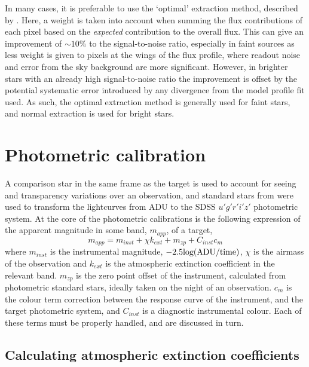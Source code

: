 In many cases, it is preferable to use the `optimal' extraction method, described by \citet{naylor1998}. Here, a weight is taken into account when summing the flux contributions of each pixel based on the {\it expected} contribution to the overall flux.
This can give an improvement of $\sim 10\%$ to the signal-to-noise ratio, especially in faint sources as less weight is given to pixels at the wings of the flux profile, where readout noise and error from the sky background are more significant.
However, in brighter stars with an already high signal-to-noise ratio the improvement is offset by the potential systematic error introduced by any divergence from the model profile fit used. As such, the optimal extraction method is generally used for faint stars, and normal extraction is used for bright stars.



\section{Photometric calibration}
\label{sect:observations:photometric extraction and calibration}

A comparison star in the same frame as the target is used to account for seeing and transparency variations over an observation, and standard stars from \citet{smith2002} were used to transform the lightcurves from ADU to the SDSS $u'g'r'i'z'$ photometric system. At the core of the photometric calibrations is the following expression of the apparent magnitude in some band, $m_{app}$, of a target,
\begin{equation}
    \label{eqn:observations:instrumental magnitude from scratch}
    m_{app} = m_{inst} + \chi k_{ext} + m_{zp} + C_{inst}c_{m}
\end{equation}
where $m_{inst}$ is the instrumental magnitude, $-2.5 \rm log(ADU / {\rm time})$, $\chi$ is the airmass of the observation and $k_{ext}$ is the atmospheric extinction coefficient in the relevant band. $m_{zp}$ is the zero point offset of the instrument, calculated from photometric standard stars, ideally taken on the night of an observation. $c_{m}$ is the colour term correction between the response curve of the instrument, and the target photometric system, and $C_{inst}$ is a diagnostic instrumental colour. Each of these terms must be properly handled, and are discussed in turn.


\subsection{Calculating atmospheric extinction coefficients}
\label{sectobservations:calculating atmospheric extinction}

